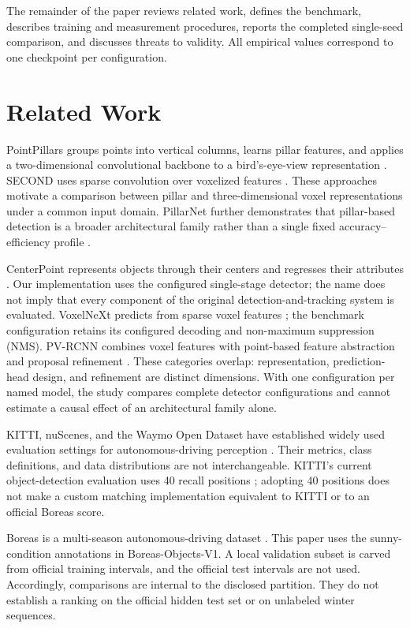\documentclass[10pt,twocolumn]{article}
\begin{document}
The remainder of the paper reviews related work, defines the benchmark, describes training and measurement procedures, reports the completed single-seed comparison, and discusses threats to validity. All empirical values correspond to one checkpoint per configuration.

\section{Related Work}

PointPillars groups points into vertical columns, learns pillar features, and applies a two-dimensional convolutional backbone to a bird's-eye-view representation \cite{lang2019pointpillars}. SECOND uses sparse convolution over voxelized features \cite{yan2018second}. These approaches motivate a comparison between pillar and three-dimensional voxel representations under a common input domain. PillarNet further demonstrates that pillar-based detection is a broader architectural family rather than a single fixed accuracy--efficiency profile \cite{shi2022pillarnet}.

CenterPoint represents objects through their centers and regresses their attributes \cite{yin2021centerpoint}. Our implementation uses the configured single-stage detector; the name does not imply that every component of the original detection-and-tracking system is evaluated. VoxelNeXt predicts from sparse voxel features \cite{chen2023voxelnext}; the benchmark configuration retains its configured decoding and non-maximum suppression (NMS). PV-RCNN combines voxel features with point-based feature abstraction and proposal refinement \cite{shi2020pvrcnn}. These categories overlap: representation, prediction-head design, and refinement are distinct dimensions. With one configuration per named model, the study compares complete detector configurations and cannot estimate a causal effect of an architectural family alone.


KITTI, nuScenes, and the Waymo Open Dataset have established widely used evaluation settings for autonomous-driving perception \cite{geiger2012kitti,caesar2020nuscenes,sun2020waymo}. Their metrics, class definitions, and data distributions are not interchangeable. KITTI's current object-detection evaluation uses 40 recall positions \cite{kitti_eval}; adopting 40 positions does not make a custom matching implementation equivalent to KITTI or to an official Boreas score.

Boreas is a multi-season autonomous-driving dataset \cite{burnett2023boreas}. This paper uses the sunny-condition annotations in Boreas-Objects-V1. A local validation subset is carved from official training intervals, and the official test intervals are not used. Accordingly, comparisons are internal to the disclosed partition. They do not establish a ranking on the official hidden test set or on unlabeled winter sequences.
\end{document}
